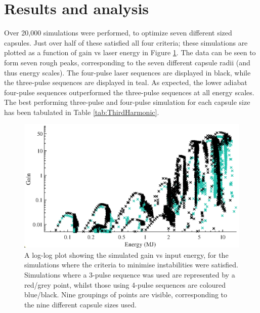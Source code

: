 \section{Results and analysis}

Over 20,000 simulations were performed, to optimize seven different sized capsules. Just over half of these satisfied all four criteria; these simulations are plotted as a function of gain vs laser energy in Figure \ref{fig:loglog}. The data can be seen to form seven rough peaks, corresponding to the seven different capsule radii (and thus energy scales). The four-pulse laser sequences are displayed in black, while the three-pulse sequences are displayed in teal. As expected, the lower adiabat four-pulse sequences outperformed the three-pulse sequences at all energy scales. The best performing three-pulse and four-pulse simulation for each capsule size has been tabulated in Table \ref{tab:ThirdHarmonic}. 

\begin{figure}[ht!]
\centering
\includegraphics{figures/LowCR/AllData_full.eps}
\caption{A log-log plot showing the simulated gain vs input energy, for the simulations where the criteria to minimise instabilities were satisfied. Simulations where a 3-pulse sequence was used are represented by a red/grey point, whilst those using 4-pulse sequences are coloured blue/black. Nine groupings of points are visible, corresponding to the nine different capsule sizes used.}
\label{fig:loglog}
\end{figure}


